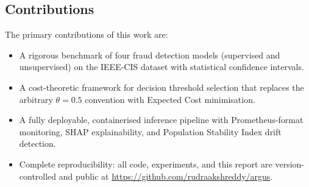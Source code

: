 \subsection{Contributions}

The primary contributions of this work are:
\begin{itemize}
    \item A rigorous benchmark of four fraud detection models (supervised and
          unsupervised) on the IEEE-CIS dataset with statistical confidence intervals.
    \item A cost-theoretic framework for decision threshold selection that
          replaces the arbitrary $\theta = 0.5$ convention with Expected Cost
          minimisation.
    \item A fully deployable, containerised inference pipeline with
          Prometheus-format monitoring, SHAP explainability, and Population
          Stability Index drift detection.
    \item Complete reproducibility: all code, experiments, and this report
          are version-controlled and public at
          \url{https://github.com/rudraakshreddy/argus}.
\end{itemize}
